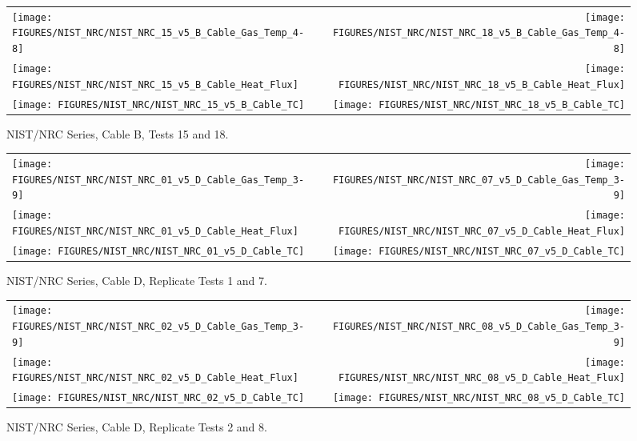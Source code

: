 \begin{figure}[h]
\begin{tabular*}{\textwidth}{l@{\extracolsep{\fill}}r}
\texttt{[image: FIGURES/NIST\_NRC/NIST\_NRC\_15\_v5\_B\_Cable\_Gas\_Temp\_4-8]} &
\texttt{[image: FIGURES/NIST\_NRC/NIST\_NRC\_18\_v5\_B\_Cable\_Gas\_Temp\_4-8]} \\
\texttt{[image: FIGURES/NIST\_NRC/NIST\_NRC\_15\_v5\_B\_Cable\_Heat\_Flux]} &
\texttt{[image: FIGURES/NIST\_NRC/NIST\_NRC\_18\_v5\_B\_Cable\_Heat\_Flux]} \\
\texttt{[image: FIGURES/NIST\_NRC/NIST\_NRC\_15\_v5\_B\_Cable\_TC]} &
\texttt{[image: FIGURES/NIST\_NRC/NIST\_NRC\_18\_v5\_B\_Cable\_TC]}
\end{tabular*}
\caption{NIST/NRC Series, Cable B, Tests 15 and 18.}
\label{NIST_NRC_B_15_and_18}
\end{figure}


\clearpage




\vspace{1in}

\begin{figure}[h!]
\begin{tabular*}{\textwidth}{l@{\extracolsep{\fill}}r}
\texttt{[image: FIGURES/NIST\_NRC/NIST\_NRC\_01\_v5\_D\_Cable\_Gas\_Temp\_3-9]} &
\texttt{[image: FIGURES/NIST\_NRC/NIST\_NRC\_07\_v5\_D\_Cable\_Gas\_Temp\_3-9]} \\
\texttt{[image: FIGURES/NIST\_NRC/NIST\_NRC\_01\_v5\_D\_Cable\_Heat\_Flux]} &
\texttt{[image: FIGURES/NIST\_NRC/NIST\_NRC\_07\_v5\_D\_Cable\_Heat\_Flux]} \\
\texttt{[image: FIGURES/NIST\_NRC/NIST\_NRC\_01\_v5\_D\_Cable\_TC]} &
\texttt{[image: FIGURES/NIST\_NRC/NIST\_NRC\_07\_v5\_D\_Cable\_TC]}
\end{tabular*}
\caption{NIST/NRC Series, Cable D, Replicate Tests 1 and 7.}
\label{NIST_NRC_D_1_and_7}
\end{figure}

\begin{figure}[h]
\begin{tabular*}{\textwidth}{l@{\extracolsep{\fill}}r}
\texttt{[image: FIGURES/NIST\_NRC/NIST\_NRC\_02\_v5\_D\_Cable\_Gas\_Temp\_3-9]} &
\texttt{[image: FIGURES/NIST\_NRC/NIST\_NRC\_08\_v5\_D\_Cable\_Gas\_Temp\_3-9]} \\
\texttt{[image: FIGURES/NIST\_NRC/NIST\_NRC\_02\_v5\_D\_Cable\_Heat\_Flux]} &
\texttt{[image: FIGURES/NIST\_NRC/NIST\_NRC\_08\_v5\_D\_Cable\_Heat\_Flux]} \\
\texttt{[image: FIGURES/NIST\_NRC/NIST\_NRC\_02\_v5\_D\_Cable\_TC]} &
\texttt{[image: FIGURES/NIST\_NRC/NIST\_NRC\_08\_v5\_D\_Cable\_TC]}
\end{tabular*}
\caption{NIST/NRC Series, Cable D, Replicate Tests 2 and 8.}
\label{NIST_NRC_D_2_and_8}
\end{figure}

